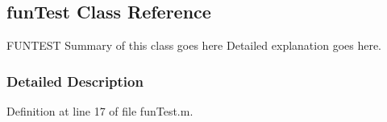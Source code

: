\hypertarget{classfun_test}{}\subsection{fun\+Test Class Reference}
\label{classfun_test}


F\+U\+N\+T\+E\+S\+T Summary of this class goes here Detailed explanation goes here.  




\subsubsection{Detailed Description}


Definition at line 17 of file fun\+Test.\+m.

